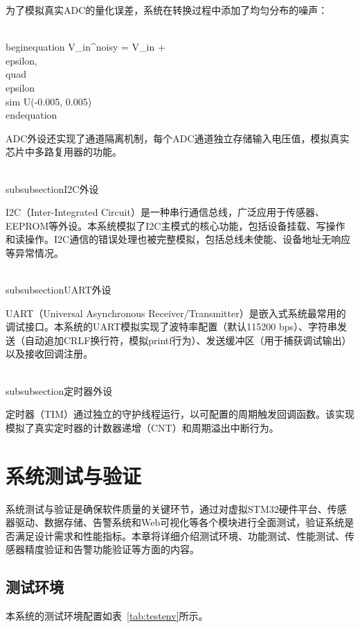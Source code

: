 \documentclass[12pt,a4paper]{ctexart}
\begin{document}
为了模拟真实ADC的量化误差，系统在转换过程中添加了均匀分布的噪声：

\\begin{equation}
V_{in}^{noisy} = V_{in} + \\epsilon, \\quad \\epsilon \\sim U(-0.005, 0.005)
\\end{equation}

ADC外设还实现了通道隔离机制，每个ADC通道独立存储输入电压值，模拟真实芯片中多路复用器的功能。

\\subsubsection{I2C外设}

I2C（Inter-Integrated Circuit）是一种串行通信总线，广泛应用于传感器、EEPROM等外设。本系统模拟了I2C主模式的核心功能，包括设备挂载、写操作和读操作。I2C通信的错误处理也被完整模拟，包括总线未使能、设备地址无响应等异常情况。

\\subsubsection{UART外设}

UART（Universal Asynchronous Receiver/Transmitter）是嵌入式系统最常用的调试接口。本系统的UART模拟实现了波特率配置（默认115200 bps）、字符串发送（自动追加CRLF换行符，模拟printf行为）、发送缓冲区（用于捕获调试输出）以及接收回调注册。

\\subsubsection{定时器外设}

定时器（TIM）通过独立的守护线程运行，以可配置的周期触发回调函数。该实现模拟了真实定时器的计数器递增（CNT）和周期溢出中断行为。


\section{系统测试与验证}

系统测试与验证是确保软件质量的关键环节，通过对虚拟STM32硬件平台、传感器驱动、数据存储、告警系统和Web可视化等各个模块进行全面测试，验证系统是否满足设计需求和性能指标。本章将详细介绍测试环境、功能测试、性能测试、传感器精度验证和告警功能验证等方面的内容。

\subsection{测试环境}

本系统的测试环境配置如表~\ref{tab:testenv}所示。
\end{document}
